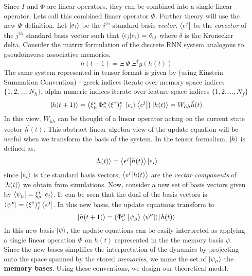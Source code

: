\documentclass[11pt]{article}
\theoremstyle{definition}
\begin{document}
Since $I$ and $\Phi$ are linear operators, they can be combined into a single linear operator. Lets call this combined linaer operator $\Phi$. Further theory will use the new $\Phi$ definition.
%
Let $\ket{e_i}$ be the $i^{\text{th}}$ standard basis \textit{vector}. $\bra{\epsilon^j}$ be the \textit{covector} of the $j^{\text{th}}$ standard basis vector such that $\bra{\epsilon_j} \ket{e_i} = \delta_{i j}$ where $\delta$ is the Kronecker delta.
%
Consider the matrix formulation of the discrete RNN system analogous to pseudoinverse associative memories.
%
\begin{dmath}
    h(t+1) = \Xi \, \Phi \, \Xi^\dag g(h(t))
\end{dmath}
%
The same system represented in tensor format is given by (using Einstein Summation Convention) - greek indices iterate over memory space indices $\{ 1, 2, \hdots, N_h \}$, alpha numeric indices iterate over feature space indices $\{ 1, 2, \hdots, N_f \}$
%
\begin{dmath}
    \ket{h(t+1)} = \left( \xi^i_{\mu} \, \Phi^\mu_\nu \, (\xi^\dag)^\nu_j \; \ket{e_i} \bra{\epsilon^j} \right) \ket{h(t)} = W_{hh} \vec{h}(t)
\end{dmath}
%
%
In this view, $W_{hh}$ can be thought of a linear operator acting on the current state vector $\vec{h}(t)$. This abstract linear algebra view of the update equation will be useful when we transform the basis of the system.
%
In the tensor formalism, $\ket{h}$ is defined as.
%
\begin{dmath}
    \ket{h(t)} = \bra{\epsilon^j} \ket{h(t)} \ket{e_i}
\end{dmath}
%
since $\ket{e_i}$ is the standard basis vectors, $\bra{\epsilon^j} \ket{h(t)}$ are the \textit{vector components} of $\ket{h(t)}$ we obtain from simulations.
%
Now, consider a new set of basis vectors given by $\bra{\psi_\mu} = \xi^i_{\mu} \ket{e_i}$. It can be seen that the dual of the basis vectors is $\bra{\psi^\nu} = (\xi^\dag)_j^\nu \bra{\epsilon^j}$. In this new basis, the update equations transform to
%
\begin{dmath}
    \ket{h(t+1)} = \left(\Phi_{\nu}^\mu \, \ket{\psi_\mu} \, \bra{\psi^\nu} \right) \ket{h(t)}
\end{dmath}
%
In this new basis $\ket{\psi}$, the update equations can be easily interpreted as applying a single linear operation $\Phi$ on $h(t)$ represented in the the memory basis $\psi$. Since the new bases simplifies the interpretation of the dynamics by projecting onto the space spanned by the stored \textit{memories}, we name the set of $\ket{\psi_\mu}$ the \textbf{memory bases}. Using these conventions, we design our theoretical model.
\end{document}

